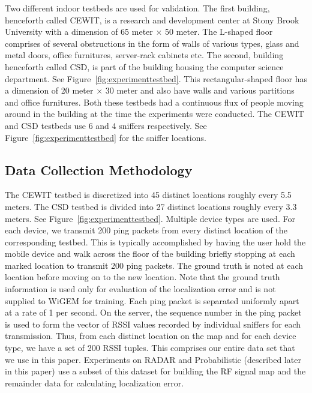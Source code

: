 Two different indoor testbeds are used for validation. The first building, henceforth called CEWIT, is a research and development center at Stony Brook University with a dimension of 65 meter $\times$ 50  meter. The L-shaped floor comprises of several obstructions in the form of walls of various types, glass and metal doors, office furnitures, server-rack cabinets etc. The second, building henceforth called CSD, is part of the building housing the computer science department. See Figure~\ref{fig:experimenttestbed}. This rectangular-shaped floor has a dimension of 20 meter $\times$ 30 meter and also have walls and various partitions and office furnitures. Both these testbeds had a continuous flux of people moving around in the building at the time
the experiments were conducted. The CEWIT and CSD testbeds use 6 and 4 sniffers respectively. 
See Figure~\ref{fig:experimenttestbed} for the sniffer locations. 

\subsection{Data Collection Methodology}
\label{subsec:datacollectionmethodology}

The CEWIT testbed is discretized into 45 distinct locations roughly every 5.5 meters. The CSD testbed is divided into 27 distinct locations roughly every 3.3 meters. See Figure~\ref{fig:experimenttestbed}. Multiple device types are used. For each device, we transmit 200 ping packets from every distinct location of the corresponding testbed. This is typically accomplished by having 
the user hold the mobile device and walk across the floor of the building briefly stopping at each marked location to transmit 200 ping packets. The ground truth is noted at each location before moving on to the new location. Note that the ground truth information is used only for evaluation of the localization error and is not supplied to WiGEM for training. Each ping packet is separated uniformly apart at a rate of 1 per second. On the server, the sequence number in the ping packet is used to form the vector of RSSI values recorded by individual sniffers for each transmission. Thus, from each distinct location on the map and for each device type, we have a set of 200 RSSI tuples. This comprises our entire data set that we use in this paper. Experiments on RADAR and Probabilistic (described later in this paper) use a subset of this dataset for building the RF signal map and the remainder data for calculating localization error. 

